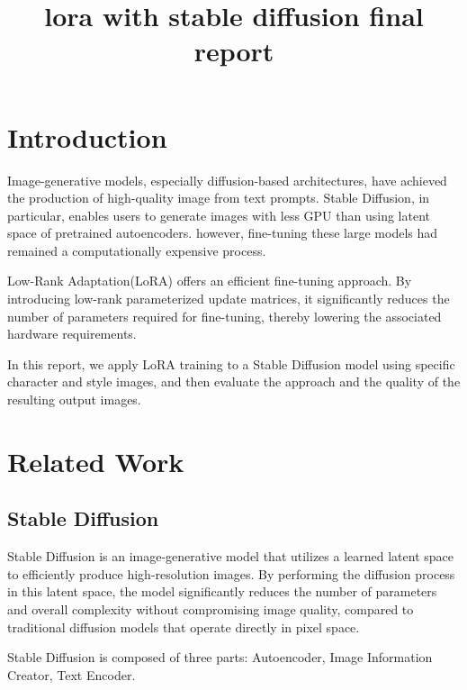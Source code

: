 \documentclass[extendedabs]{bmvc2k}
\begin{document}
\title{lora with stable diffusion final report}

 

\maketitle
\noindent

\section{Introduction}
Image-generative models, especially diffusion-based architectures\cite{diffusion}, have achieved the production of high-quality image from text prompts. Stable Diffusion\cite{latentdiffusion}\cite{stablediffusion}, in particular, enables users to generate images with less GPU than \cite{diffusion} using latent space of pretrained autoencoders. however, fine-tuning these large models had remained a computationally expensive process.

Low-Rank Adaptation(LoRA) \cite{lora} offers an efficient fine-tuning approach. By introducing low-rank parameterized update matrices, it significantly reduces the number of parameters required for fine-tuning, thereby lowering the associated hardware requirements.

In this report, we apply LoRA training to a Stable Diffusion model using specific character and style images, and then evaluate the approach and the quality of the resulting output images.

\section{Related Work}
\subsection{Stable Diffusion}
Stable Diffusion \cite{latentdiffusion}\cite{stablediffusion} is an image-generative model that utilizes a learned latent space to efficiently produce high-resolution images. By performing the diffusion process in this latent space, the model significantly reduces the number of parameters and overall complexity without compromising image quality, compared to traditional diffusion models that operate directly in pixel space.

Stable Diffusion\cite{stablediffusion} is composed of three parts: Autoencoder, Image Information Creator, Text Encoder. 
\end{document}
